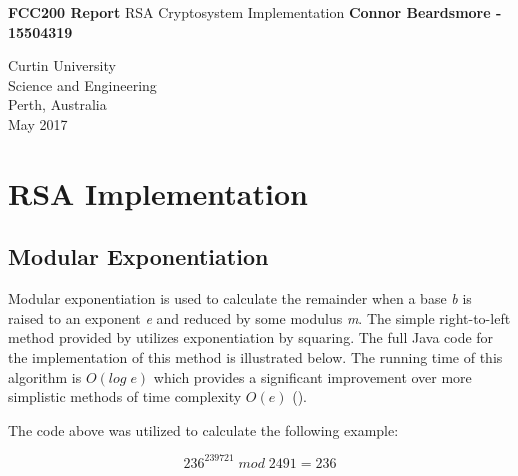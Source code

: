 \documentclass[]{article}
\begin{document}



\begin{titlepage}
	\begin{center}
		\vspace*{1cm}
		\LARGE\textbf{FCC200 Report}
		\break
		RSA Cryptosystem Implementation
		\vspace{1cm}
		\break
		\Large\textbf{Connor Beardsmore - 15504319} 
		\vspace{15cm}

		\normalsize
		Curtin University \\
		Science and Engineering \\
		Perth, Australia \\
	    May 2017
	    
	\end{center}
\end{titlepage}

\vspace*{-0.8cm}
\section*{\hfil RSA Implementation\hfil}

\subsection*{Modular Exponentiation}
\noindent
Modular exponentiation is used to calculate the remainder when a base \textit{b} is raised to an exponent \textit{e} and reduced by some modulus \textit{m}. The simple right-to-left method provided by \cite{alttext} utilizes exponentiation by squaring. The full Java code for the implementation of this method is illustrated below. The running time of this algorithm is $O(log\;e)$ which provides a significant improvement over more simplistic methods of time complexity $O(e)$ (\cite{maintext}).

\vspace{0.5cm}
{}

\noindent
The code above was utilized to calculate the following example:

$$236^{239721}\;mod\;2491=236$$
\end{document}

